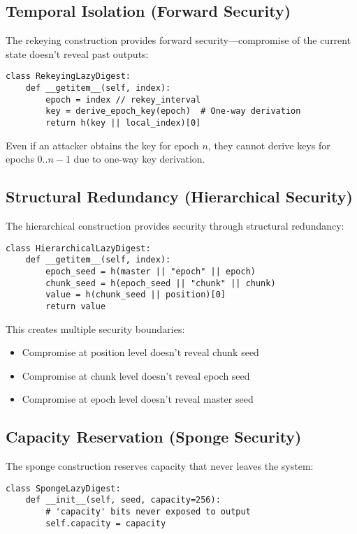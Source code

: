 \documentclass[11pt]{article}
\begin{document}
\subsection{Temporal Isolation (Forward Security)}

The rekeying construction provides forward security---compromise of the current state doesn't reveal past outputs:

\begin{lstlisting}
class RekeyingLazyDigest:
    def __getitem__(self, index):
        epoch = index // rekey_interval
        key = derive_epoch_key(epoch)  # One-way derivation
        return h(key || local_index)[0]
\end{lstlisting}

Even if an attacker obtains the key for epoch $n$, they cannot derive keys for epochs $0..n-1$ due to one-way key derivation.

\subsection{Structural Redundancy (Hierarchical Security)}

The hierarchical construction provides security through structural redundancy:

\begin{lstlisting}
class HierarchicalLazyDigest:
    def __getitem__(self, index):
        epoch_seed = h(master || "epoch" || epoch)
        chunk_seed = h(epoch_seed || "chunk" || chunk)
        value = h(chunk_seed || position)[0]
        return value
\end{lstlisting}

This creates multiple security boundaries:
\begin{itemize}
\item Compromise at position level doesn't reveal chunk seed
\item Compromise at chunk level doesn't reveal epoch seed
\item Compromise at epoch level doesn't reveal master seed
\end{itemize}

\subsection{Capacity Reservation (Sponge Security)}

The sponge construction reserves capacity that never leaves the system:

\begin{lstlisting}
class SpongeLazyDigest:
    def __init__(self, seed, capacity=256):
        # 'capacity' bits never exposed to output
        self.capacity = capacity
\end{lstlisting}
\end{document}
